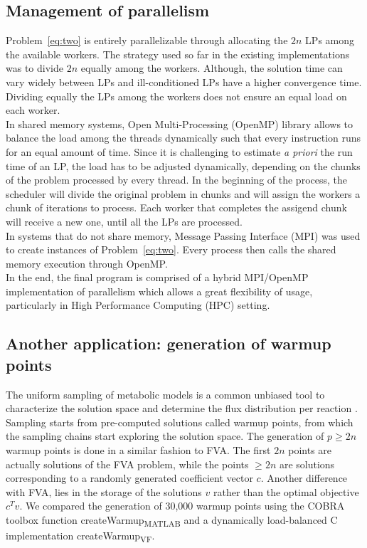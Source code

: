\subsection*{Management of parallelism}
Problem~\ref{eq:two} is entirely parallelizable through allocating the $2n$ LPs among the available workers. The strategy used so far in the existing implementations was to divide $2n$ equally among the workers. Although, the solution time can vary widely between LPs and ill-conditioned LPs have a higher convergence time. Dividing equally the LPs among the workers does not ensure an equal load on each worker. \\
In shared memory systems, Open Multi-Processing (OpenMP) library allows to balance the load among the threads dynamically such that every instruction runs for an equal amount of time. Since it is challenging to estimate \textit{a priori} the run time of an LP, the load has to be adjusted dynamically, depending on the chunks of the problem processed by every thread. In the beginning of the process, the scheduler will divide the original problem in chunks and will assign the workers a chunk of iterations to process. Each worker that completes the assigend chunk will receive a new one, until all the LPs are processed.\\
In systems that do not share memory, Message Passing Interface (MPI) was used to create instances of Problem~\ref{eq:two}. Every process then calls the shared memory execution through OpenMP.\\
In the end, the final program is comprised of a hybrid MPI/OpenMP implementation of parallelism which allows a great flexibility of usage, particularly in High Performance Computing (HPC) setting.
\subsection*{Another application: generation of warmup points}
The uniform sampling of metabolic models is a common unbiased tool to characterize the solution space and determine the flux distribution per reaction \cite{bordel2010sampling,megchelenbrink2014optgpsampler}. Sampling starts from pre-computed solutions called warmup points, from which the sampling chains start exploring the solution space. The generation of $p \geq 2n$ warmup points is done in a similar fashion to FVA. The first $2n$ points are actually solutions of the FVA problem, while the points $\geq 2n$ are solutions corresponding to a randomly generated coefficient vector $c$. Another difference with FVA, lies in the storage of the solutions $v$ rather than the optimal objective $c^{T}v$. We compared the generation of 30,000 warmup points using the COBRA toolbox function createWarmup\textsubscript{MATLAB}  and a dynamically load-balanced C implementation createWarmup\textsubscript{VF}.
